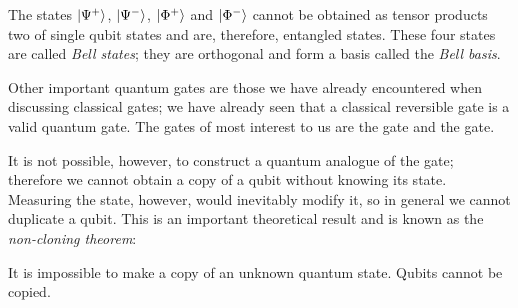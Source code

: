 The states $\Ket{\Psi^+}$, $\Ket{\Psi^-}$, $\Ket{\Phi^+}$ and $\Ket{\Phi^-}$ cannot be obtained as tensor products two of single qubit states and are, therefore, entangled states. These four states are called \emph{Bell states}; they are orthogonal and form a basis called the \emph{Bell basis}.

Other important quantum gates are those we have already encountered when discussing classical gates; we have already seen that a classical reversible gate is a valid quantum gate. The gates of most interest to us are the  gate and the  gate.

It is not possible, however, to construct a quantum analogue of the  gate; therefore we cannot obtain a copy of a qubit without knowing its state. Measuring the state, however, would inevitably modify it, so in general we cannot duplicate a qubit. This is an important theoretical result and is known as the \emph{non-cloning theorem}:
\begin{theorem}
	It is impossible to make a copy of an unknown quantum state. Qubits cannot be copied.
\end{theorem}


